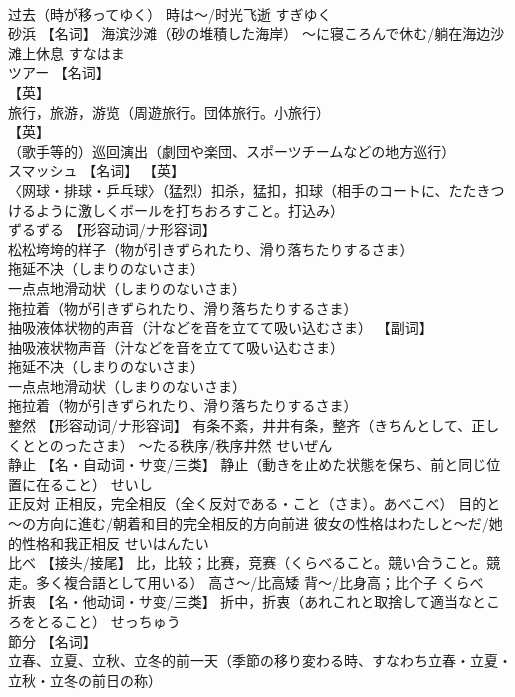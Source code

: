 \documentclass[8pt]{extreport}
\begin{document}
\begin{CJK}{UTF8}{min}
\\	过去（時が移ってゆく） 時は～/时光飞逝	すぎゆく	
\\	砂浜	【名词】 海滨沙滩（砂の堆積した海岸） ～に寝ころんで休む/躺在海边沙滩上休息	すなはま	
\\	ツアー	【名词】 
\\	【英】
\\	旅行，旅游，游览（周遊旅行。団体旅行。小旅行） 
\\	【英】
\\	（歌手等的）巡回演出（劇団や楽団、スポーツチームなどの地方巡行）		
\\	スマッシュ	【名词】 【英】
\\	〈网球・排球・乒乓球〉（猛烈）扣杀，猛扣，扣球（相手のコートに、たたきつけるように激しくボールを打ちおろすこと。打込み）		
\\	ずるずる	【形容动词/ナ形容词】 
\\	松松垮垮的样子（物が引きずられたり、滑り落ちたりするさま） 
\\	拖延不决（しまりのないさま） 
\\	一点点地滑动状（しまりのないさま） 
\\	拖拉着（物が引きずられたり、滑り落ちたりするさま） 
\\	抽吸液体状物的声音（汁などを音を立てて吸い込むさま） 【副词】 
\\	抽吸液状物声音（汁などを音を立てて吸い込むさま） 
\\	拖延不决（しまりのないさま） 
\\	一点点地滑动状（しまりのないさま） 
\\	拖拉着（物が引きずられたり、滑り落ちたりするさま）		
\\	整然	【形容动词/ナ形容词】 有条不紊，井井有条，整齐（きちんとして、正しくととのったさま） ～たる秩序/秩序井然	せいぜん	
\\	静止	【名・自动词・サ变/三类】 静止（動きを止めた状態を保ち、前と同じ位置に在ること）	せいし	
\\	正反対	正相反，完全相反（全く反対である・こと（さま）。あべこべ） 目的と～の方向に進む/朝着和目的完全相反的方向前进 彼女の性格はわたしと～だ/她的性格和我正相反	せいはんたい	
\\	比べ	【接头/接尾】 比，比较；比赛，竞赛（くらべること。競い合うこと。競走。多く複合語として用いる） 高さ～/比高矮 背～/比身高；比个子	くらべ	
\\	折衷	【名・他动词・サ变/三类】 折中，折衷（あれこれと取捨して適当なところをとること）	せっちゅう	
\\	節分	【名词】 
\\	立春、立夏、立秋、立冬的前一天（季節の移り変わる時、すなわち立春・立夏・立秋・立冬の前日の称） 

\end{CJK}
\end{document}
